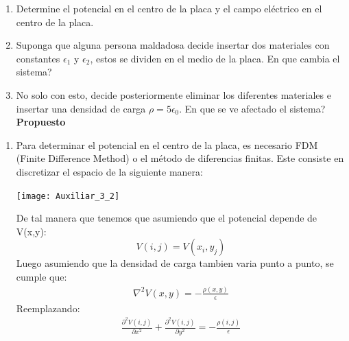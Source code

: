 \documentclass[
  11pt,
  letterpaper,
   addpoints,
   answers
  ]{exam}
\begin{document}
\begin{questions}
\begin{center}
    \end{center}
    \begin{enumerate}
        \item Determine el potencial en el centro de la placa y el campo eléctrico en el centro de la placa.
        \item Suponga que alguna persona maldadosa decide insertar dos materiales con constantes $\epsilon_{1}$ y $\epsilon_{2}$, estos se dividen en el medio de la placa. En que cambia el sistema?
        \item No solo con esto, decide posteriormente eliminar los diferentes materiales e insertar una densidad de carga $\rho = 5 \epsilon_{0}$. En que se ve afectado el sistema? \textbf{Propuesto}
    \end{enumerate}
    \begin{solution}
        \begin{enumerate}
            \item Para determinar el potencial en el centro de la placa, es necesario FDM (Finite Difference Method) o el método de diferencias finitas. Este consiste en discretizar el espacio de la siguiente manera:
            \begin{center}
                \texttt{[image: Auxiliar\_3\_2]}
              \end{center}
            De tal manera que tenemos que asumiendo que el potencial depende de V(x,y):
            \begin{equation}
                V(i,j) = V(x_{i},y_{j})
            \end{equation}
            Luego asumiendo que la densidad de carga tambien varia punto a punto, se cumple que:
            \begin{align}
                \nabla^{2}V(x,y) = -\frac{\rho(x,y)}{\epsilon}
            \end{align}
            Reemplazando:
            \begin{align}
                \frac{\partial^{2}V(i,j)}{\partial x^{2}} + \frac{\partial^{2}V(i,j)}{\partial y^{2}} = -\frac{\rho(i,j)}{\epsilon}
            \end{align}

\end{enumerate}
\end{solution}
\end{questions}
\end{document}
